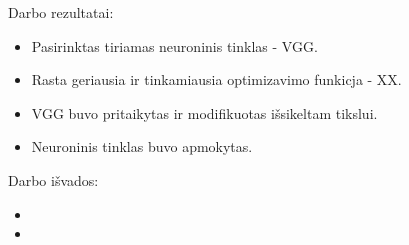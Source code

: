 \documentclass{VUMIFPSkursinis}
\begin{document}
Darbo rezultatai:
\begin{itemize}
\item Pasirinktas tiriamas neuroninis tinklas - VGG.
\item Rasta geriausia ir tinkamiausia optimizavimo funkicja - XX.
\item VGG buvo pritaikytas ir modifikuotas išsikeltam tikslui.
\item Neuroninis tinklas buvo apmokytas.
\end{itemize}


Darbo išvados:
\begin{itemize}
\item 
\item
\end{itemize}

\printbibliography[heading=bibintoc]  %
\end{document}
